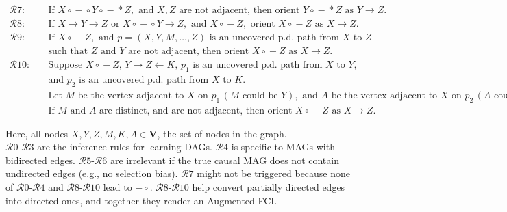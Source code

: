 \documentclass[main.tex]{subfiles}
\begin{document}
\begin{align*}
\mathcal{R}7: \quad & \text{If } X \circ\!\!-\!\!\circ Y \circ\!\!-\!\!\ast Z, \text{ and } X, Z \text{ are not adjacent, then orient } Y \circ\!\!-\!\!\ast Z \text{ as } Y \rightarrow Z. \\[1em]
\mathcal{R}8: \quad & \text{If } X \rightarrow Y \rightarrow Z \text{ or } X \circ\!\!-\!\!\circ Y \rightarrow Z, \text{ and } X \circ\!\!-\!\!Z, \text{ orient } X \circ\!\!-\!\!Z \text{ as } X \rightarrow Z. \\[1em]
\mathcal{R}9: \quad & \text{If } X \circ\!\!-\!\!Z, \text{ and } p = (X, Y, M, \ldots, Z) \text{ is an uncovered p.d. path from } X \text{ to } Z \\
& \text{such that } Z \text{ and } Y \text{ are not adjacent, then orient } X \circ\!\!-\!\!Z \text{ as } X \rightarrow Z. \\[1em]
\mathcal{R}10: \quad & \text{Suppose } X \circ\!\!-\!\!Z,\, Y \rightarrow Z \leftarrow K,\, p_1 \text{ is an uncovered p.d. path from } X \text{ to } Y, \\
& \text{and } p_2 \text{ is an uncovered p.d. path from } X \text{ to } K. \\
& \text{Let } M \text{ be the vertex adjacent to } X \text{ on } p_1\, (M \text{ could be } Y), \text{ and } A \text{ be the vertex adjacent to } X \text{ on } p_2\, (A \text{ could be } K). \\
& \text{If } M \text{ and } A \text{ are distinct, and are not adjacent, then orient } X \circ\!\!-\!\!Z \text{ as } X \rightarrow Z.
\end{align*}

\noindent
Here, all nodes \( X, Y, Z, M, K, A \in \mathbf{V} \), the set of nodes in the graph.\\
\(\mathcal{R}0\)-\(\mathcal{R}3\) are the inference rules for learning DAGs. \(\mathcal{R}4\) is specific to MAGs with bidirected edges. \(\mathcal{R}5\)-\(\mathcal{R}6\) are irrelevant if the true causal MAG does not contain undirected edges (e.g., no selection bias). \(\mathcal{R}7\) might not be triggered because none of \(\mathcal{R}0\)-\(\mathcal{R}4\) and \(\mathcal{R}8\)-\(\mathcal{R}10\) lead to \( -\!\!\circ \). \(\mathcal{R}8\)-\(\mathcal{R}10\) help convert partially directed edges into directed ones, and together they render an Augmented FCI.
\end{document}
